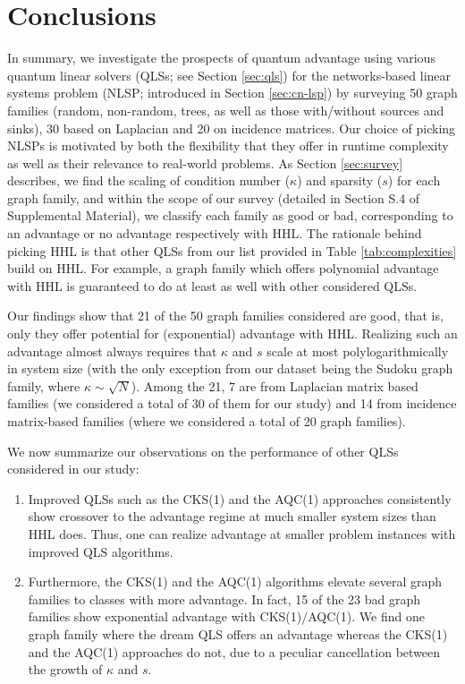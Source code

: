 \documentclass[%
 reprint,
 superscriptaddress,
 amsmath,amssymb,
 aps,
 pra,
floatfix,
nofootinbib,
]{revtex4-2}
\theoremstyle{definition}
\theoremstyle{remark}
\begin{document}
\section{Conclusions} \label{sec:conclusion}

In summary, we investigate the prospects of quantum advantage using various quantum linear solvers (QLSs; see Section \ref{sec:qls}) for the networks-based linear systems problem (NLSP; introduced in Section \ref{sec:cn-lsp}) by surveying 50 graph families (random, non-random, trees, as well as those with/without sources and sinks), 30 based on Laplacian and 20 on incidence matrices. Our choice of picking NLSPs is motivated by both the flexibility that they offer in runtime complexity as well as their relevance to real-world problems. As Section \ref{sec:survey} describes, we find the scaling of condition number ($\kappa$) and sparsity ($s$) for each graph family, and within the scope of our survey (detailed in Section S.4 of Supplemental Material), we classify each family as good or bad, corresponding to an advantage or no advantage respectively with HHL. The rationale behind picking HHL is that other QLSs from our list provided in Table \ref{tab:complexities} build on HHL. For example, a graph family which offers polynomial advantage with HHL is guaranteed to do at least as well with other considered QLSs. 

Our findings show that 21 of the 50 graph families considered are good, that is, only they offer potential for (exponential) advantage with HHL. Realizing such an advantage almost always requires that $\kappa$ and $s$ scale at most polylogarithmically in system size (with the only exception from our dataset being the Sudoku graph family, where $\kappa \sim \sqrt{N}$). Among the 21, 7 are from Laplacian matrix based families (we considered a total of 30 of them for our study) and 14 from incidence matrix-based families (where we considered a total of 20 graph families). 

We now summarize our observations on the performance of other QLSs considered in our study: 

\begin{enumerate}
\item Improved QLSs such as the CKS(1) and the AQC(1) approaches consistently show crossover to the advantage regime at much smaller system sizes than HHL does. Thus, one can realize advantage at smaller problem instances with improved QLS algorithms. 
\item Furthermore, the CKS(1) and the AQC(1) algorithms elevate several graph families to classes with more advantage. In fact, 15 of the 23 bad graph families show exponential advantage with CKS(1)/AQC(1). We find one graph family where the dream QLS offers an advantage whereas the CKS(1) and the AQC(1) approaches do not, due to a peculiar cancellation between the growth of $\kappa$ and $s$. 
\end{enumerate} 
\end{document}
